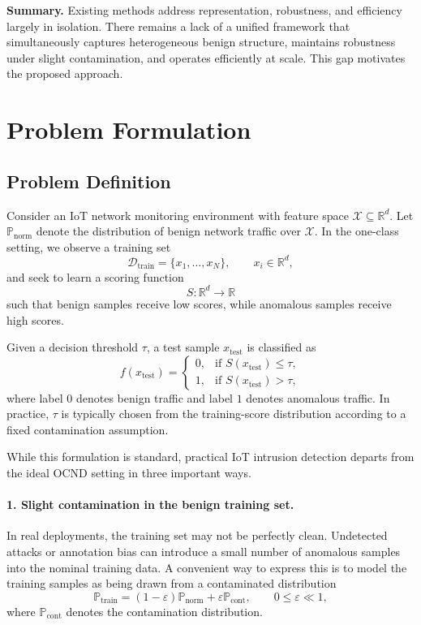 \documentclass[final,twocolumn,10pt]{elsarticle}
\begin{document}
\textbf{Summary.} Existing methods address representation, robustness, and efficiency largely in isolation. There remains a lack of a unified framework that simultaneously captures heterogeneous benign structure, maintains robustness under slight contamination, and operates efficiently at scale. This gap motivates the proposed approach.

\section{Problem Formulation}

\subsection{Problem Definition}
\label{sec:problem_def}

Consider an IoT network monitoring environment with feature space $\mathcal{X}\subseteq\mathbb{R}^{d}$. Let $\mathbb{P}_{\text{norm}}$ denote the distribution of benign network traffic over $\mathcal{X}$. In the one-class setting, we observe a training set
\[
\mathcal{D}_{\text{train}}=\{x_1,\ldots,x_N\}, \qquad x_i\in\mathbb{R}^{d},
\]
and seek to learn a scoring function
\[
S:\mathbb{R}^{d}\rightarrow\mathbb{R}
\]
such that benign samples receive low scores, while anomalous samples receive high scores.

Given a decision threshold $\tau$, a test sample $x_{\text{test}}$ is classified as
\begin{equation}
f(x_{\text{test}})=
\begin{cases}
0, & \text{if } S(x_{\text{test}})\le \tau,\\
1, & \text{if } S(x_{\text{test}})> \tau,
\end{cases}
\label{eq:ocnd_decision}
\end{equation}
where label $0$ denotes benign traffic and label $1$ denotes anomalous traffic. In practice, $\tau$ is typically chosen from the training-score distribution according to a fixed contamination assumption. 

While this formulation is standard, practical IoT intrusion detection departs from the ideal OCND setting in three important ways.

\paragraph{1. Slight contamination in the benign training set.}
In real deployments, the training set may not be perfectly clean. Undetected attacks or annotation bias can introduce a small number of anomalous samples into the nominal training data. A convenient way to express this is to model the training samples as being drawn from a contaminated distribution
\begin{equation}
\mathbb{P}_{\text{train}}=(1-\varepsilon)\mathbb{P}_{\text{norm}}+\varepsilon \mathbb{P}_{\text{cont}},
\qquad 0\le \varepsilon \ll 1,
\label{eq:contaminated_train}
\end{equation}
where $\mathbb{P}_{\text{cont}}$ denotes the contamination distribution. 
\end{document}
